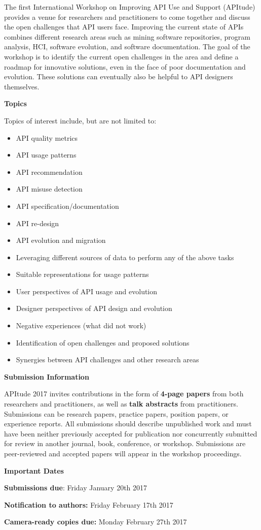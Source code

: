 \documentclass[10pt, conference]{IEEEtran}
\begin{document}
The first International Workshop on Improving API Use and Support (APItude) provides a venue for researchers and practitioners to come together and discuss the open challenges that API users face. Improving the current state of APIs combines different research areas such as mining software repositories, program analysis, HCI, software evolution, and software documentation. The goal of the workshop is to identify the current open challenges in the area and define a roadmap for innovative solutions, even in the face of poor documentation and evolution. These solutions can eventually also be helpful to API designers themselves.


\vspace{0.2cm}

\noindent
\textbf{\large Topics}
\vspace{0.2cm}

Topics of interest include, but are not limited to:
\begin{itemize}
\item API quality metrics
\item API usage patterns
\item API recommendation
\item API misuse detection
\item API specification/documentation
\item API re-design
\item API evolution and migration
\item Leveraging different sources of data to perform any of the above tasks
\item Suitable representations for usage patterns
\item User perspectives of API usage and evolution
\item Designer perspectives of API design and evolution
\item Negative experiences (what did not work)
\item Identification of open challenges and proposed solutions
\item Synergies between API challenges and other research areas  
\end{itemize}


\vspace{0.2cm}
\noindent
\textbf{\large Submission Information}
\vspace{0.2cm}

APItude 2017 invites contributions in the form of \textbf{4-page papers} from both researchers and practitioners, as well as \textbf{talk abstracts} from practitioners. Submissions can be research papers, practice papers, position papers, or experience reports. All submissions should describe unpublished work and must have been neither previously accepted for publication nor concurrently submitted for review in another journal, book, conference, or workshop. Submissions are peer-reviewed and accepted papers will appear in the workshop proceedings.

\vspace{0.2cm}
\noindent
\textbf{\large Important Dates}
\vspace{0.2cm}

\textbf{Submissions due}: Friday January 20th 2017

\textbf{Notification to authors:} Friday February 17th 2017

\textbf{Camera-ready copies due:} Monday February 27th 2017
\end{document}

